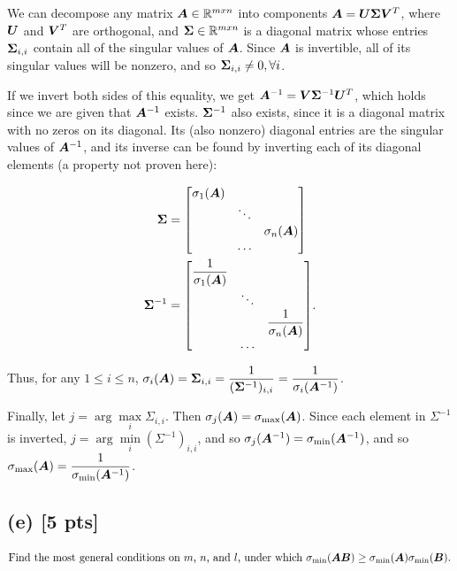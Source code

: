 \documentclass[twoside,10pt]{article}
\begin{document}
  We can decompose any matrix $\bm{A} \in \mathbb{R}^{mxn}$ into components $\bm{A} = \bm{U} \bm{\Sigma} \bm{V}^T$, where $\bm{U}$ and $\bm{V}^T$ are orthogonal, and $\bm{\Sigma} \in \mathbb{R}^{mxn}$ is a diagonal matrix whose entries $\bm{\Sigma}_{i,i}$ contain all of the singular values of $\bm{A}$.
  Since $\bm{A}$ is invertible, all of its singular values will be nonzero, and so $\bm{\Sigma}_{i,i} \neq 0, \forall i$.

  If we invert both sides of this equality, we get $\bm{A}^{-1} = \bm{V} \bm{\Sigma}^{-1} \bm{U}^T$, which holds since we are given that $\bm{A}^{-1}$ exists.
  $\bm{\Sigma}^{-1}$ also exists, since it is a diagonal matrix with no zeros on its diagonal.
  Its (also nonzero) diagonal entries are the singular values of $\bm{A}^{-1}$, and its inverse can be found by inverting each of its diagonal elements (a property not proven here):

  \begin{align*}
    \mtx{\Sigma} &=
    \begin{bmatrix}
      \sigma_{1}(\mtx{A}) &  & \\ 
      & \ddots & \\ 
      &  & \sigma_{n}(\mtx{A})\\
      & \dots
    \end{bmatrix}\\
    \mtx{\Sigma}^{-1} &=
    \begin{bmatrix}
      \dfrac{1}{\sigma_{1}(\mtx{A})} &  & \\ 
      & \ddots & \\ 
      &  & \dfrac{1}{\sigma_{n}(\mtx{A})}\\
      & \dots
    \end{bmatrix}.
  \end{align*}

  Thus, for any $1 \leq i \leq n$, $\sigma_i(\bm{A}) = \bm{\Sigma}_{i,i} = \dfrac{1}{(\bm{\Sigma}^{-1})_{i,i}} = \dfrac{1}{\sigma_i(\bm{A}^{-1})}$.

  Finally, let $j = \arg\!\max\limits_{i}{\Sigma_{i,i}}$.
  Then $\sigma_j(\bm{A}) = \sigma_{\mathrm{max}}(\bm{A})$.
  Since each element in $\Sigma^{-1}$ is inverted, $j = \arg\!\min\limits_{i}{(\Sigma^{-1})_{i,i}}$, and so $\sigma_j(\bm{A}^{-1}) = \sigma_{\mathrm{min}}(\bm{A}^{-1})$, and so $\sigma_{\mathrm{max}}\left(\mtx{A}\right) = \dfrac{1}{\sigma_{\mathrm{min}}\left(\mtx{A}^{-1}\right)}$.

\subsection*{(e) [5 pts]}
  \begin{equation*}
    \text{Find the most general conditions on $m$, $n$, and $l$, under which } \sigma_{\mathrm{min}}\left(\mtx{A}\mtx{B}\right) \geq \sigma_{\mathrm{min}}\left(\mtx{A}\right) \sigma_{\mathrm{min}}\left(\mtx{B}\right).
  \end{equation*}
\end{document}
